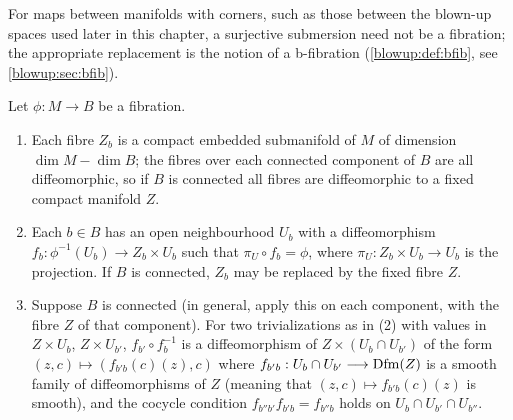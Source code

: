 For maps between manifolds with corners, such as those between the blown-up spaces used
later in this chapter, a surjective submersion need not be a fibration; the appropriate
replacement is the notion of a b-fibration (\cref{blowup:def:bfib}, see
\cref{blowup:sec:bfib}).

\begin{theorem}\label{product:thm:local-triviality}
Let $\phi:M\longrightarrow B$ be a fibration.
\begin{enumerate}[label=\textup{(\arabic*)}]
\item Each fibre $Z_b$ is a compact embedded submanifold of $M$ of dimension
$\dim M-\dim B$; the fibres over each connected component of $B$ are all
diffeomorphic, so if $B$ is connected all fibres are diffeomorphic to a fixed
compact manifold $Z$.
\item Each $b\in B$ has an open neighbourhood $U_b$ with a diffeomorphism
$f_b:\phi^{-1}(U_b)\longrightarrow Z_b\times U_b$ such that
$\pi_{U}\circ f_b=\phi$, where $\pi_U:Z_b\times U_b\longrightarrow U_b$ is the
projection. If $B$ is connected, $Z_b$ may be replaced by the fixed fibre $Z$.
\item Suppose $B$ is connected \textup{(}in general, apply this on each component,
with the fibre $Z$ of that component\textup{)}. For two trivializations as in
\textup{(2)} with values in $Z\times U_b$, $Z\times U_{b'}$, $f_{b'}\circ f_b^{-1}$
is a diffeomorphism of $Z\times(U_b\cap U_{b'})$ of the form $(z,c)\longmapsto(f_{b'b}(c)(z),c)$ where
$f_{b'b}:U_b\cap U_{b'}\longrightarrow\operatorname{Dfm}(Z)$ is a smooth family of
diffeomorphisms of $Z$ \textup{(}meaning that $(z,c)\mapsto f_{b'b}(c)(z)$ is
smooth\textup{)}, and the cocycle condition
$f_{b''b'}f_{b'b}=f_{b''b}$ holds on $U_b\cap U_{b'}\cap U_{b''}$.
\end{enumerate}
\end{theorem}

